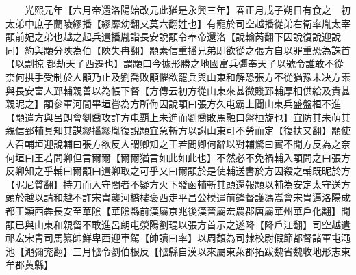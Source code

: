 　　光熙元年【六月帝還洛陽始改元此猶是永興三年】春正月戊子朔日有食之　初太弟中庶子蘭陵繆播【繆靡幼翻又莫六翻姓也】有寵於司空越播從弟右衛率胤太宰顒前妃之弟也越之起兵遣播胤詣長安說顒令奉帝還洛【說輸芮翻下因說復說迎說同】約與顒分陜為伯【陜失冉翻】顒素信重播兄弟即欲從之張方自以罪重恐為誅首【以剽掠都劫天子西遷也】謂顒曰今據形勝之地國富兵彊奉天子以號令誰敢不從柰何拱手受制於人顒乃止及劉喬敗顒懼欲罷兵與山東和解恐張方不從猶豫未决方素與長安富人郅輔親善以為帳下督【方傳云初方從山東來甚微賤郅輔厚相供給及貴甚親昵之】顒參軍河間畢垣嘗為方所侮因說顒曰張方久屯霸上聞山東兵盛盤桓不進【顒遣方與呂朗會劉喬攻許方屯覇上未進而劉喬敗馬融曰盤桓旋也】宜防其未萌其親信郅輔具知其謀繆播繆胤復說顒宜急斬方以謝山東可不勞而定【復扶又翻】顒使人召輔垣迎說輔曰張方欲反人謂卿知之王若問卿何辭以對輔驚曰實不聞方反為之奈何垣曰王若問卿但言爾爾【爾爾猶言如此如此也】不然必不免禍輔入顒問之曰張方反卿知之乎輔曰爾顒曰遣卿取之可乎又曰爾顒於是使輔送書於方因殺之輔既昵於方【昵尼質翻】持刀而入守閤者不疑方火下發函輔斬其頭還報顒以輔為安定太守送方頭於越以請和越不許宋胄襲河橋樓褒西走平昌公模遣前鋒督護馮嵩會宋胄逼洛陽成都王穎西犇長安至華隂【華隂縣前漢屬京兆後漢晉屬宏農郡唐屬華州華戶化翻】聞顒已與山東和親留不敢進呂朗屯滎陽劉琨以張方首示之遂降【降戶江翻】司空越遣祁宏宋胄司馬纂帥鮮卑西迎車駕【帥讀曰率】以周馥為司隸校尉假節都督諸軍屯澠池【澠彌兖翻】三月惤令劉伯根反【惤縣自漢以來屬東萊郡拓跋魏省魏收地形志東牟郡黄縣】

